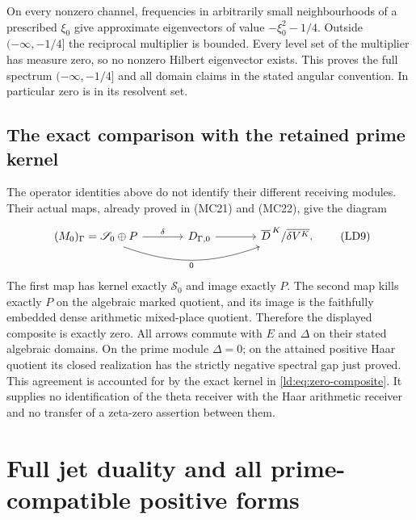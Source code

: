 \documentclass[11pt,a4paper]{article}
\theoremstyle{definition}\newtheorem{definition}[theorem]{Definition}
\begin{document}
On every nonzero channel, frequencies in arbitrarily small
neighbourhoods of a prescribed $\xi_0$ give approximate
eigenvectors of value $-\xi_0^2-1/4$. Outside
$(-\infty,-1/4]$ the reciprocal multiplier is bounded.
Every level set of the multiplier has measure zero, so no
nonzero Hilbert eigenvector exists. This proves the full spectrum
$(-\infty,-1/4]$ and all domain claims in the stated angular
convention. In particular zero is in its resolvent set.

\subsection{The exact comparison with the retained prime kernel}

The operator identities above do not identify their different
receiving modules. Their actual maps, already proved in (MC21)
and (MC22), give the diagram
\[
 \begin{tikzcd}[column sep=large]
 (M_0)_\Gamma=\mathscr S_0\oplus P
 \arrow[r,"\delta"]\arrow[rr,bend right=20,"0"']
 &D_{\Gamma,0}\arrow[r]
 &\overline D^{\,K}/\overline{\delta V^K}.
 \end{tikzcd}
 \tag{LD9}\label{ld:eq:zero-composite}
\]
The first map has kernel exactly $\mathscr S_0$ and image
exactly $P$. The second map kills exactly $P$ on the algebraic
marked quotient, and its image is the faithfully embedded dense
arithmetic mixed-place quotient. Therefore the displayed composite
is exactly zero. All arrows commute with $E$ and $\Delta$ on
their stated algebraic domains. On the prime module $\Delta=0$;
on the attained positive Haar quotient its closed realization
has the strictly negative spectral gap just proved. This
agreement is accounted for by the exact kernel in
\eqref{ld:eq:zero-composite}. It supplies no identification of the
theta receiver with the Haar arithmetic receiver and no transfer
of a zeta-zero assertion between them.


\section{Full jet duality and all prime-compatible positive forms}
\end{document}
